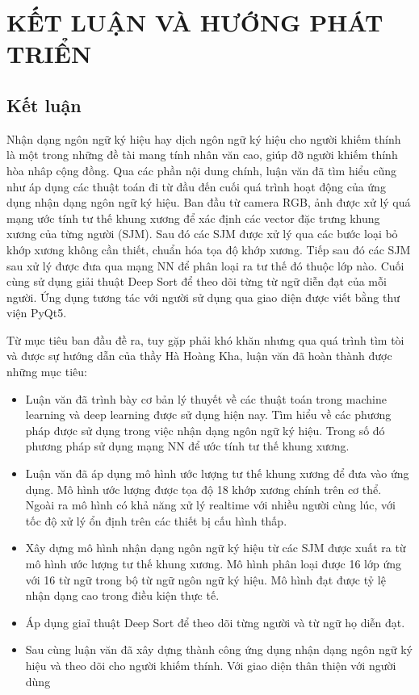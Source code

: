 \chapter{KẾT LUẬN VÀ HƯỚNG PHÁT TRIỂN}

\section{Kết luận}

Nhận dạng ngôn ngữ ký hiệu hay dịch ngôn ngữ ký hiệu cho người khiếm thính là một trong những đề tài mang tính nhân văn cao, giúp đỡ người khiếm thính hòa nhâp cộng đồng. Qua các phần nội dung chính, luận văn đã tìm hiểu cũng như áp dụng các thuật toán đi từ đầu đến cuối quá trình hoạt động của ứng dụng nhận dạng ngôn ngữ ký hiệu. Ban đầu từ camera RGB, ảnh được xử lý quá mạng ước tính tư thế khung xương để xác định các vector đặc trưng khung xương của từng người (SJM). Sau đó các SJM được xử lý qua các bước loại bỏ khớp xương không cần thiết, chuẩn hóa tọa độ khớp xương. Tiếp sau đó các SJM sau xử lý được đưa qua mạng NN để phân loại ra tư thế đó thuộc lớp nào. Cuối cùng sử dụng giải thuật Deep Sort để theo dõi từng từ ngữ diễn đạt của mỗi người. Ứng dụng tương tác với người sử dụng qua giao diện được viết bằng thư viện PyQt5. 

Từ mục tiêu ban đầu đề ra, tuy gặp phải khó khăn nhưng qua quá trình tìm tòi và được sự hướng dẫn của thầy Hà Hoàng Kha, luận văn đã hoàn thành được những mục tiêu:
\begin{itemize}
\item Luận văn đã trình bày cơ bản lý thuyết về các thuật toán trong machine learning và deep learning được sử dụng hiện nay. Tìm hiểu về các phương pháp được sử dụng trong việc nhận dạng ngôn ngữ ký hiệu. Trong số đó phương pháp sử dụng mạng NN để ước tính tư thế khung xương.
\item Luận văn đã áp dụng mô hình ước lượng tư thế khung xương để đưa vào ứng dụng. Mô hình ước lượng được tọa độ 18 khớp xương chính trên cơ thể. Ngoài ra mô hình có khả năng xử lý realtime với nhiều người cùng lúc, với tốc độ xử lý ổn định trên các thiết bị cấu hình thấp.
\item Xây dựng mô hình nhận dạng ngôn ngữ ký hiệu từ các SJM được xuất ra từ mô hình ước lượng tư thế khung xương. Mô hình phân loại được 16 lớp ứng với 16 từ ngữ trong bộ từ ngữ ngôn ngữ ký hiệu. Mô hình đạt được tỷ lệ nhận dạng cao trong điều kiện thực tế.
\item Áp dụng giaỉ thuật Deep Sort để theo dõi từng người và từ ngữ họ diễn đạt.
\item Sau cùng luận văn đã xây dựng thành công ứng dụng nhận dạng ngôn ngữ ký hiệu và theo dõi cho người khiếm thính. Với giao diện thân thiện với người dùng
\end{itemize}

